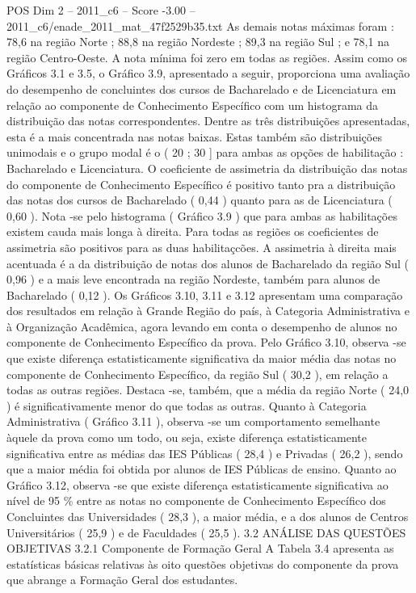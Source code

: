 \begin{textsample}{POS Dim 2 – 2011\_c6 – Score -3.00 – 2011\_c6/enade\_2011\_mat\_47f2529b35.txt}
As demais notas máximas foram : 78,6 na região Norte ; 88,8 na região Nordeste ; 89,3 na região Sul ; e 78,1 na região Centro-Oeste.
A nota mínima foi zero em todas as regiões.
Assim como os Gráficos 3.1 e 3.5, o Gráfico 3.9, apresentado a seguir, proporciona uma avaliação do desempenho de concluintes dos cursos de Bacharelado e de Licenciatura em relação ao componente de Conhecimento Específico com um histograma da distribuição das notas correspondentes.
Dentre as três distribuições apresentadas, esta é a mais concentrada nas notas baixas.
Estas também são distribuições unimodais e o grupo modal é o ( 20 ; 30 ] para ambas as opções de habilitação : Bacharelado e Licenciatura.
O coeficiente de assimetria da distribuição das notas do componente de Conhecimento Específico é positivo tanto pra a distribuição das notas dos cursos de Bacharelado ( 0,44 ) quanto para as de Licenciatura ( 0,60 ).
Nota -se pelo histograma ( Gráfico 3.9 ) que para ambas as habilitações existem cauda mais longa à direita.
Para todas as regiões os coeficientes de assimetria são positivos para as duas habilitaçcões.
A assimetria à direita mais acentuada é a da distribuição de notas dos alunos de Bacharelado da região Sul ( 0,96 ) e a mais leve encontrada na região Nordeste, também para alunos de Bacharelado ( 0,12 ).
Os Gráficos 3.10, 3.11 e 3.12 apresentam uma comparação dos resultados em relação à Grande Região do país, à Categoria Administrativa e à Organização Acadêmica, agora levando em conta o desempenho de alunos no componente de Conhecimento Específico da prova.
Pelo Gráfico 3.10, observa -se que existe diferença estatisticamente significativa da maior média das notas no componente de Conhecimento Específico, da região Sul ( 30,2 ), em relação a todas as outras regiões.
Destaca -se, também, que a média da região Norte ( 24,0 ) é significativamente menor do que todas as outras.
Quanto à Categoria Administrativa ( Gráfico 3.11 ), observa -se um comportamento semelhante àquele da prova como um todo, ou seja, existe diferença estatisticamente significativa entre as médias das IES Públicas ( 28,4 ) e Privadas ( 26,2 ), sendo que a maior média foi obtida por alunos de IES Públicas de ensino.
Quanto ao Gráfico 3.12, observa -se que existe diferença estatisticamente significativa ao nível de 95 \% entre as notas no componente de Conhecimento Específico dos Concluintes das Universidades ( 28,3 ), a maior média, e a dos alunos de Centros Universitários ( 25,9 ) e de Faculdades ( 25,5 ). 3.2 ANÁLISE DAS QUESTÕES OBJETIVAS 3.2.1 Componente de Formação Geral A Tabela 3.4 apresenta as estatísticas básicas relativas às oito questões objetivas do componente da prova que abrange a Formação Geral dos estudantes.

\end{textsample}
